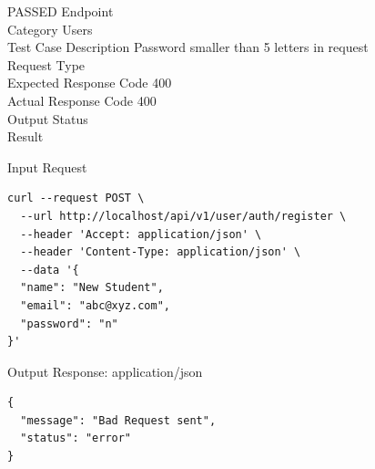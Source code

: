 \begin{testcase}{56}{PASSED}
Endpoint \hfill {}\\
Category \hfill Users\\
Test Case Description \hfill Password smaller than 5 letters in request\\

Request Type    \hfill {}\\
Expected Response Code    \hfill 400\\
Actual Response Code    \hfill 400\\

Output Status \hfill {}\\
Result \hfill {}

\begin{ipblock}{Input Request}
\begin{verbatim}
curl --request POST \
  --url http://localhost/api/v1/user/auth/register \
  --header 'Accept: application/json' \
  --header 'Content-Type: application/json' \
  --data '{
  "name": "New Student",
  "email": "abc@xyz.com",
  "password": "n"
}'
\end{verbatim}
\end{ipblock}

\begin{opblock}{Output Response: application/json}
\begin{verbatim}
{
  "message": "Bad Request sent",
  "status": "error"
}
\end{verbatim}
\end{opblock}
\end{testcase}

